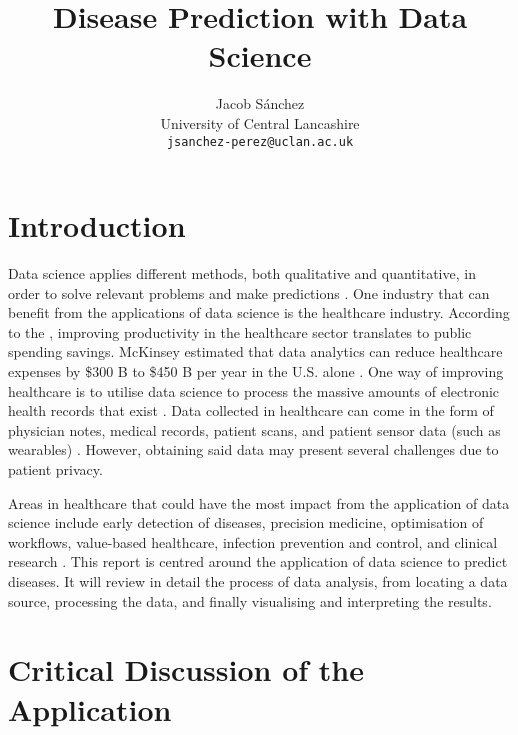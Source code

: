 \documentclass[a4paper,12pt]{article}
\title{Disease Prediction with Data Science}
\author{Jacob Sánchez\\ University of Central Lancashire\\\texttt{jsanchez-perez@uclan.ac.uk}}
\date{}
\begin{document}
\maketitle


\section{Introduction}



Data science applies different methods, both qualitative and quantitative, in order to solve relevant problems and make predictions \parencite[78]{Waller2013}.
One industry that can benefit from the applications of data science is the healthcare industry.
According to the \textcite{oecd2010health}, improving productivity in the healthcare sector translates to public spending savings.
McKinsey estimated that data analytics can reduce healthcare expenses by \$300 B to \$450 B per year in the U.S. alone \parencite{Groves2013}.
One way of improving healthcare is to utilise data science to process the massive amounts of electronic health records that exist \parencite{Dalianis2015}.
Data collected in healthcare can come in the form of physician notes, medical records, patient scans, and patient sensor data (such as wearables) \parencite{Adam2017}.
However, obtaining said data may present several challenges due to patient privacy. 

Areas in healthcare that could have the most impact from the application of data science include early detection of diseases, precision medicine, optimisation of workflows, value-based healthcare, infection prevention and control, and clinical research \parencite[9]{Consoli2019}.
This report is centred around the application of data science to predict diseases.
It will review in detail the process of data analysis, from locating a data source, processing the data, and finally visualising and interpreting the results.

\section{Critical Discussion of the Application}

\end{document}
